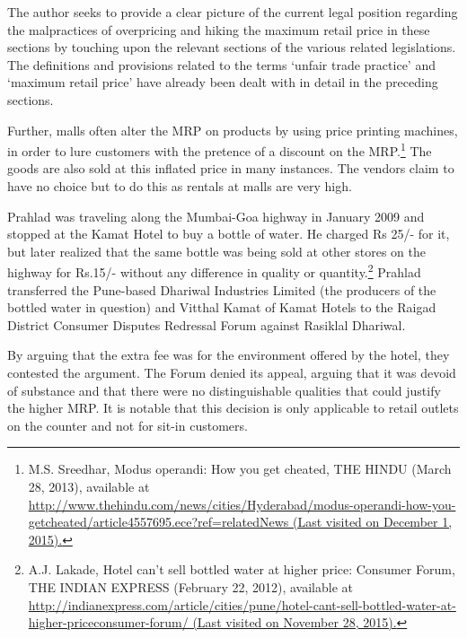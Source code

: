 \begin{multicols}{2}

\noi
The author seeks to provide a clear picture of the current legal position regarding the
malpractices of overpricing and hiking the maximum retail price in these sections by touching
upon the relevant sections of the various related legislations. The definitions and provisions
related to the terms ‘unfair trade practice’ and ‘maximum retail price’ have already been dealt
with in detail in the preceding sections.

\noi
Further, malls often alter the MRP on products by using price printing machines, in order to
lure customers with the pretence of a discount on the MRP.\footnote{M.S. Sreedhar, Modus operandi: How you get cheated, THE HINDU (March 28, 2013), available at\\  \url{http://www.thehindu.com/news/cities/Hyderabad/modus-operandi-how-you-getcheated/article4557695.ece?ref=relatedNews (Last visited on December 1, 2015).}} The goods are also sold at this
inflated price in many instances. The vendors claim to have no choice but to do this as rentals
at malls are very high.

\noi
Prahlad was traveling along the Mumbai-Goa highway in January 2009 and stopped at the
Kamat Hotel to buy a bottle of water. He charged Rs 25/- for it, but later realized that the same
bottle was being sold at other stores on the highway for Rs.15/- without any difference in
quality or quantity.\footnote{ A.J. Lakade, Hotel can’t sell bottled water at higher price: Consumer Forum, THE INDIAN EXPRESS (February 22, 2012), available at \url{http://indianexpress.com/article/cities/pune/hotel-cant-sell-bottled-water-at-higher-priceconsumer-forum/ (Last visited on November 28, 2015).}} Prahlad transferred the Pune-based Dhariwal Industries Limited (the producers of the bottled water in question) and Vitthal Kamat of Kamat Hotels to the Raigad
District Consumer Disputes Redressal Forum against Rasiklal Dhariwal.

\noi
By arguing that the extra fee was for the environment offered by the hotel, they contested the
argument. The Forum denied its appeal, arguing that it was devoid of substance and that there
were no distinguishable qualities that could justify the higher MRP. It is notable that this
decision is only applicable to retail outlets on the counter and not for sit-in customers.


\end{multicols}
